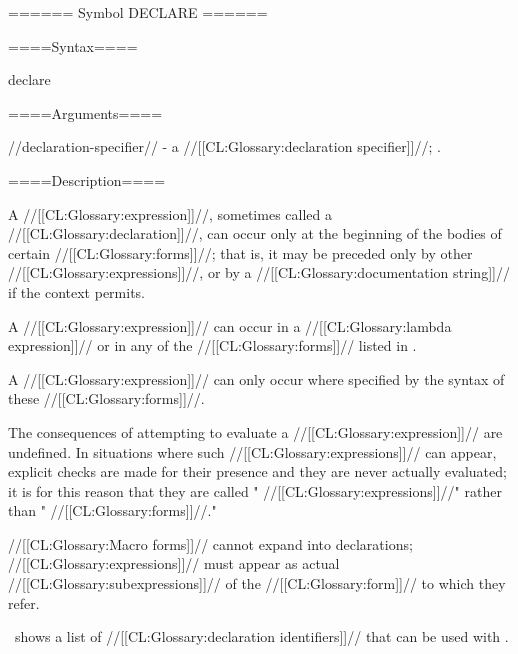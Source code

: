 ====== Symbol DECLARE ======

====Syntax====

\Defspec declare {}

====Arguments====

//declaration-specifier// - a //[[CL:Glossary:declaration specifier]]//; \noeval.

====Description====

A  //[[CL:Glossary:expression]]//, sometimes called a //[[CL:Glossary:declaration]]//, can occur only at the beginning of the bodies of certain //[[CL:Glossary:forms]]//; that is, it may be preceded only by other  //[[CL:Glossary:expressions]]//, or by a //[[CL:Glossary:documentation string]]// if the context permits.

A  //[[CL:Glossary:expression]]// can occur in a //[[CL:Glossary:lambda expression]]// or in any of the //[[CL:Glossary:forms]]// listed in \thenextfigure.


A  //[[CL:Glossary:expression]]// can only occur where specified by the syntax of these //[[CL:Glossary:forms]]//.

The consequences of attempting to evaluate a  //[[CL:Glossary:expression]]// are undefined. In situations where such //[[CL:Glossary:expressions]]// can appear, explicit checks are made for their presence and they are never actually evaluated; it is for this reason that they are called " //[[CL:Glossary:expressions]]//" rather than " //[[CL:Glossary:forms]]//."

//[[CL:Glossary:Macro forms]]// cannot expand into declarations;  //[[CL:Glossary:expressions]]// must appear as actual //[[CL:Glossary:subexpressions]]// of the //[[CL:Glossary:form]]// to which they refer.

\Thenextfigure\ shows a list of //[[CL:Glossary:declaration identifiers]]// that can be used with .

